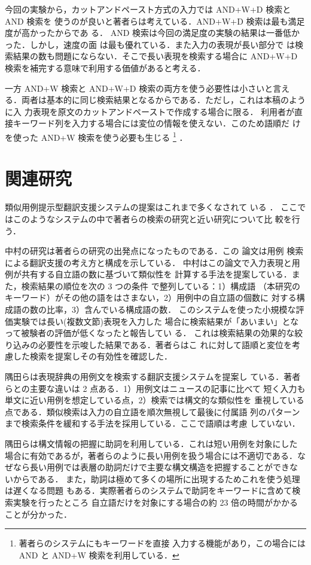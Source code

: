 今回の実験から，カットアンドペースト方式の入力では AND+W+D 検索と AND 検索を
使うのが良いと著者らは考えている．AND+W+D 検索は最も満足度が高かったからであ
る．
AND 検索は今回の満足度の実験の結果は一番低かった．しかし，速度の面
は最も優れている．また入力の表現が長い部分で
は検索結果の数も問題にならない．そこで長い表現を検索する場合に AND+W+D 
検索を補完する意味で利用する価値があると考える．

一方 AND+W 検索と AND+W+D 検索の両方を使う必要性は小さいと言え
る．両者は基本的に同じ検索結果となるからである．ただし，これは本稿のように入
力表現を原文のカットアンドペーストで作成する場合に限る．
利用者が直接キーワード列を入力する場合には変位の情報を使えない．このため語順だ
けを使った AND+W 検索を使う必要も生じる
\footnote{著者らのシステムにもキーワードを直接
入力する機能があり，この場合には AND と AND+W 検索を利用している．}
．
\section{関連研究}
\label{sec:kanren}
類似用例提示型翻訳支援システムの提案はこれまで多くなされて
いる
\cite{Naka89,Sumi91,Tera92,Sato93,Take94,Hyou94,Kitamu96,Aoya95}
．
ここではこのようなシステムの中で著者らの検索の研究と近い研究について比
較を行う．

中村\cite{Naka89}の研究は著者らの研究の出発点になったものである．この
論文は用例
検索による翻訳支援の考え方と構成を示している．
中村はこの論文で入力表現と用例が共有する自立語の数に基づいて類似性を
計算する手法を提案している．また，検索結果の順位を次の 3 つの条件
で整列している：1）構成語
（本研究のキーワード）がその他の語をはさまない，2）用例中の自立語の個数に
対する構成語の数の比率，3）含んでいる構成語の数．
このシステムを使った小規模な評価実験では長い(複数文節)表現を入力した
場合に検索結果が「あいまい」となって被験者の評価が低くなったと報告してい
る．
これは検索結果の効果的な絞り込みの必要性を示唆した結果である．著者らはこ
れに対して語順と変位を考慮した検索を提案しその有効性を確認した．

隅田ら\cite{Sumi91}は表現辞典の用例文を検索する翻訳支援システムを提案し
ている．著者らとの主要な違いは 2 点ある．1）用例文はニュースの記事に比べて
短く入力も単文に近い用例を想定している点，2）検索では構文的な類似性を
重視している点である．類似検索は入力の自立語を順次無視して最後に付属語
列のパターンまで検索条件を緩和する手法を採用している．ここで語順は考慮
していない．

隅田らは構文情報の把握に助詞を利用している．これは短い用例を対象にした
場合に有効であるが，著者らのように長い用例を扱う場合には不適切である．な
ぜなら長い用例では表層の助詞だけで主要な構文構造を把握することができな
いからである．
また，助詞は極めて多くの場所に出現するためこれを使う処理は遅くなる問題
もある．実際著者らのシステムで助詞をキーワードに含めて検索実験を行ったところ
自立語だけを対象にする場合の約 23 倍の時間がかかることが分かった．

